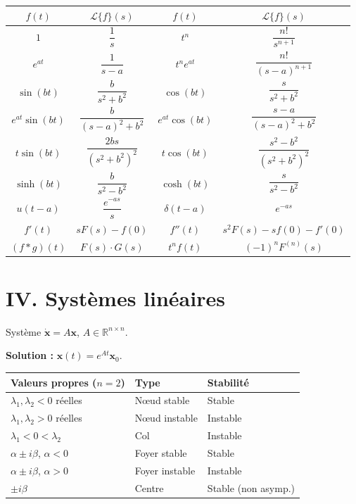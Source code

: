 \documentclass[12pt,a4paper,openany]{book}
\theoremstyle{definition}
\theoremstyle{plain}
\theoremstyle{remark}
\newcommand{\R}{\mathbb{R}}
\begin{document}
\renewcommand{\arraystretch}{1.5}
\begin{center}
\begin{tabular}{cc|cc}
\toprule
$f(t)$ & $\mathcal{L}\{f\}(s)$ &
$f(t)$ & $\mathcal{L}\{f\}(s)$ \\
\midrule
$1$ & $\dfrac{1}{s}$ &
$t^n$ & $\dfrac{n!}{s^{n+1}}$ \\[6pt]
$e^{at}$ & $\dfrac{1}{s-a}$ &
$t^n e^{at}$ & $\dfrac{n!}{(s-a)^{n+1}}$ \\[6pt]
$\sin(bt)$ & $\dfrac{b}{s^2+b^2}$ &
$\cos(bt)$ & $\dfrac{s}{s^2+b^2}$ \\[6pt]
$e^{at}\sin(bt)$ & $\dfrac{b}{(s-a)^2+b^2}$ &
$e^{at}\cos(bt)$ & $\dfrac{s-a}{(s-a)^2+b^2}$ \\[6pt]
$t\sin(bt)$ & $\dfrac{2bs}{(s^2+b^2)^2}$ &
$t\cos(bt)$ & $\dfrac{s^2-b^2}{(s^2+b^2)^2}$ \\[6pt]
$\sinh(bt)$ & $\dfrac{b}{s^2-b^2}$ &
$\cosh(bt)$ & $\dfrac{s}{s^2-b^2}$ \\[6pt]
$u(t-a)$ & $\dfrac{e^{-as}}{s}$ &
$\delta(t-a)$ & $e^{-as}$ \\[6pt]
$f'(t)$ & $sF(s) - f(0)$ &
$f''(t)$ & $s^2F(s) - sf(0) - f'(0)$ \\[6pt]
$(f*g)(t)$ & $F(s)\cdot G(s)$ &
$t^n f(t)$ & $(-1)^n F^{(n)}(s)$ \\
\bottomrule
\end{tabular}
\end{center}

\section*{IV. Systèmes linéaires}

Système $\dot{\mathbf{x}} = A\mathbf{x}$, $A \in \R^{n \times n}$.

\medskip
\noindent\textbf{Solution :} $\mathbf{x}(t) = e^{At}\mathbf{x}_0$.

\medskip
\renewcommand{\arraystretch}{1.5}
\begin{center}
\begin{tabular}{p{5cm} p{4cm} p{4cm}}
\toprule
\textbf{Valeurs propres ($n=2$)} & \textbf{Type} & \textbf{Stabilité} \\
\midrule
$\lambda_1, \lambda_2 < 0$ réelles & N\oe ud stable & Stable \\
$\lambda_1, \lambda_2 > 0$ réelles & N\oe ud instable & Instable \\
$\lambda_1 < 0 < \lambda_2$ & Col & Instable \\
$\alpha \pm i\beta$, $\alpha < 0$ & Foyer stable & Stable \\
$\alpha \pm i\beta$, $\alpha > 0$ & Foyer instable & Instable \\
$\pm i\beta$ & Centre & Stable (non asymp.) \\
\bottomrule
\end{tabular}
\end{center}
\end{document}
